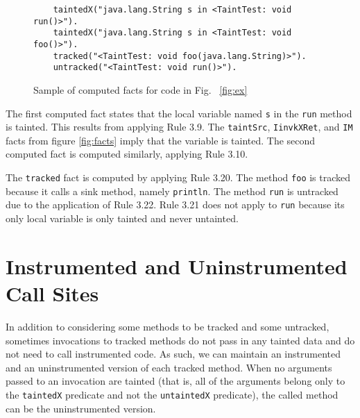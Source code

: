 \begin{figure}[H]
  \begin{lstlisting}
    taintedX("java.lang.String s in <TaintTest: void run()>").
    taintedX("java.lang.String s in <TaintTest: void foo()>").
    tracked("<TaintTest: void foo(java.lang.String)>").
    untracked("<TaintTest: void run()>").
  \end{lstlisting}
  \caption{Sample of computed facts for code in Fig.~ \ref{fig:ex}}\label{fig:sol}
\end{figure}

The first computed fact states that the local variable named \texttt{s} in the \texttt{run} method is tainted. This results from applying Rule 3.9. The \texttt{taintSrc}, \texttt{IinvkXRet}, and \texttt{IM} facts from figure \ref{fig:facts} imply that the variable is tainted. The second computed fact is computed similarly, applying Rule 3.10.

The \texttt{tracked} fact is computed by applying Rule 3.20. The method \texttt{foo} is tracked because it calls a sink method, namely \texttt{println}. The method \texttt{run} is untracked due to the application of Rule 3.22. Rule 3.21 does not apply to \texttt{run} because its only local variable is only tainted and never untainted. 
    
\section{Instrumented and Uninstrumented Call Sites}
In addition to considering some methods to be tracked and some
untracked, sometimes invocations to tracked methods do not pass in any
tainted data and do not need to call instrumented code. As such, we
can maintain an instrumented and an uninstrumented version of each
tracked method. When no arguments passed to an invocation are tainted
(that is, all of the arguments belong only to the \texttt{taintedX}
predicate and not the \texttt{untaintedX} predicate), the called
method can be the uninstrumented version.

